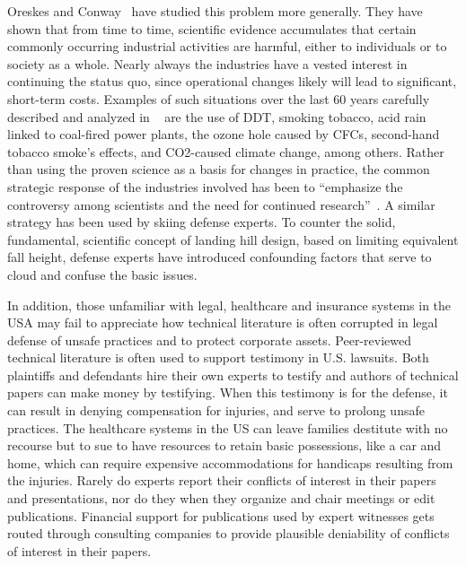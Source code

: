 \documentclass[smallextended]{svjour3}       %
\begin{document}
Oreskes and Conway~\cite{Oreskes2010} have studied this problem more generally.
They have shown that from time to time, scientific evidence accumulates that
certain commonly occurring industrial activities are harmful, either to
individuals or to society as a whole. Nearly always the industries have a
vested interest in continuing the status quo, since operational changes likely
will lead to significant, short-term costs. Examples of such situations
over the last 60 years carefully described and analyzed in
~\cite{Oreskes2010} are the use of DDT, smoking tobacco, acid rain linked to
coal-fired power plants, the ozone hole caused by CFCs, second-hand tobacco
smoke’s effects, and CO2-caused climate change, among others. Rather than using
the proven science as a basis for changes in practice, the common strategic
response of the industries involved has been to “emphasize the controversy
among scientists and the need for continued research”~\cite{Oreskes2010}. A
similar strategy has been used by skiing defense experts. To counter the solid,
fundamental, scientific concept of landing hill design, based on limiting equivalent
fall height, defense experts have introduced confounding factors that serve to
cloud and confuse the basic issues. 


In addition, those unfamiliar with legal, healthcare and insurance systems in the USA may fail to appreciate how technical literature is often corrupted in legal defense of unsafe practices and to protect corporate assets. Peer-reviewed technical literature is often used to support testimony in U.S. lawsuits. Both plaintiffs and defendants hire their own experts to testify and authors of technical papers can make money by testifying. When this testimony is for the defense, it can result in denying compensation for injuries, and serve to prolong unsafe practices. The healthcare systems in the US can leave families destitute with no recourse but to sue to have resources to retain basic possessions, like a car and home, which can require expensive accommodations for handicaps resulting from the injuries. Rarely do experts report their conflicts of interest in their papers and presentations, nor do they when they organize and chair meetings or edit publications. Financial support for publications used by expert witnesses gets routed through consulting companies to provide plausible deniability of conflicts of interest in their papers. 
\end{document}
